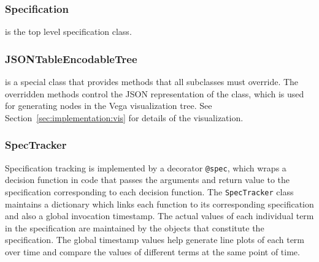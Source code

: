 \subsubsection{Specification} is the top level specification class. 

\subsubsection{JSONTableEncodableTree} is a special class that provides methods that all subclasses must override. 
The overridden methods control the JSON representation of the class, which is used for generating nodes in the Vega visualization tree. See Section~\ref{sec:implementation:vis} for details of the visualization. 

\subsubsection{SpecTracker} Specification tracking is implemented by a decorator \texttt{@spec}, which wraps a decision function in code that passes the arguments and return value to the specification corresponding to each decision function.
The \texttt{SpecTracker} class maintains a dictionary which links each function to its corresponding specification and also a global invocation timestamp. 
The actual values of each individual term in the specification are maintained by the objects that constitute the specification.
The global timestamp values help generate line plots of each term over time and compare the values of different terms at the same point of time. 

\newcommand{\Eb}{\bar{E}}
\newcommand{\eps}{\epsilon}

